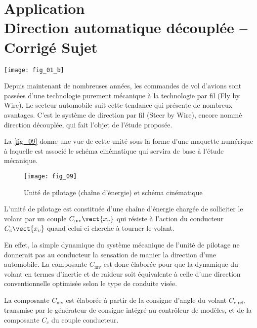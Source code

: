 \chapter*{Application  \\ 
Direction automatique découplée -- \ifprof Corrigé \else Sujet \fi}
\iflivret {} \else
\ifprof  {} \else \fi
\fi
\setcounter{question}{0}

\begin{marginfigure}
\texttt{[image: fig\_01\_b]}
\end{marginfigure}


\ifprof
\else
Depuis maintenant de nombreuses années, les commandes de vol d'avions sont passées d'une
technologie purement mécanique à la technologie par fil (Fly by Wire). Le secteur automobile suit cette
tendance qui présente de nombreux avantages. C'est le système de direction par fil (Steer by Wire), encore nommé direction découplée, qui fait l'objet de l'étude proposée.


La \autoref{fig_09} donne une vue de cette unité sous la forme d'une maquette numérique à laquelle est
associé le schéma cinématique qui servira de base à l'étude mécanique.

\begin{figure}[H]
\centering
\texttt{[image: fig\_09]}

\caption{Unité de pilotage (chaîne d'énergie) et schéma cinématique  \label{fig_09}}
\end{figure}

L'unité de pilotage est constituée d'une chaîne d'énergie chargée de solliciter le volant par un
couple $C_{\text{mv}} \vect{x_v}$ qui résiste à l'action du conducteur $C_{c} \vect{x_v}$
quand celui-ci cherche à tourner le volant.

En effet, la simple dynamique du système mécanique de l'unité de pilotage ne donnerait pas au
conducteur la sensation de manier la direction d'une automobile. La composante $C_{\text{mv}}$ est donc élaborée pour que la dynamique du volant en termes d'inertie et de raideur soit équivalente à celle d'une direction conventionnelle optimisée selon le type de conduite visée.

La composante $C_{\text{mv}}$ est élaborée à partir de la consigne d'angle du volant $C_{\text{v\_ref}}$, transmise par le
générateur de consigne intégré au contrôleur de modèles, et de la composante $C_c$ du couple
conducteur.

